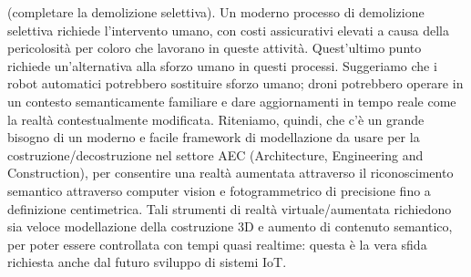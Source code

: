 (completare la demolizione selettiva). Un moderno processo di demolizione selettiva richiede l'intervento umano,
con costi assicurativi elevati a causa della pericolosità per coloro che lavorano in queste attività.
Quest'ultimo punto richiede un'alternativa alla sforzo umano in questi processi. Suggeriamo che i robot automatici
potrebbero sostituire sforzo umano; droni potrebbero operare in un
contesto semanticamente familiare e dare aggiornamenti in tempo reale come la realtà contestualmente modificata.
Riteniamo, quindi, che c'è un grande bisogno di un moderno e facile framework di modellazione da usare per la
costruzione/decostruzione nel settore AEC (Architecture, Engineering and Construction),
per consentire una realtà aumentata attraverso il riconoscimento semantico attraverso computer vision e
fotogrammetrico di precisione fino a definizione centimetrica.
Tali strumenti di realtà virtuale/aumentata
richiedono sia veloce modellazione della costruzione 3D e aumento di contenuto semantico, per poter essere controllata con
tempi quasi realtime: questa è la vera sfida richiesta anche dal futuro sviluppo di sistemi IoT.


